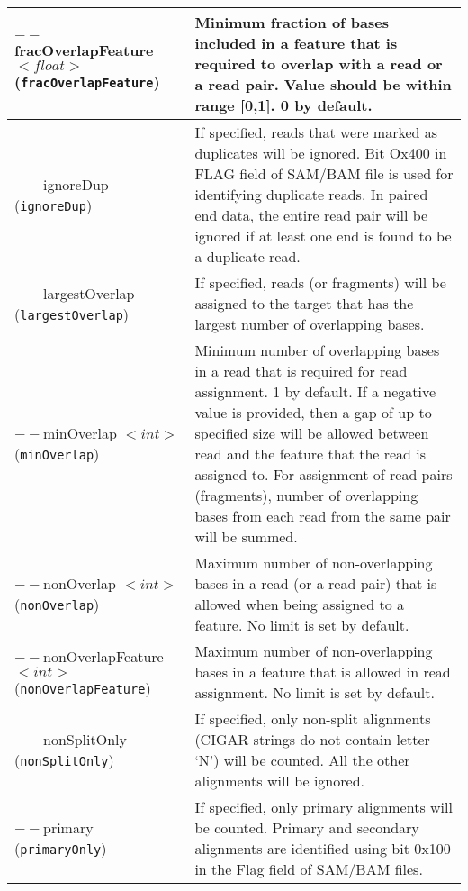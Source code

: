 \documentclass[12pt]{report}
\newcommand{\code}[1]{{\small\texttt{#1}}}
\begin{document}
\begin{longtable}{|p{5cm}|p{11cm}|}
\hline
$--$fracOverlapFeature $<float>$ \newline (\code{fracOverlapFeature}) & Minimum fraction of bases included in a feature that is required to overlap with a read or a read pair. Value should be within range [0,1]. 0 by default. \\
\hline
$--$ignoreDup \newline (\code{ignoreDup}) & If specified, reads that were marked as duplicates will be ignored. Bit Ox400 in FLAG field of SAM/BAM file is used for identifying duplicate reads. In paired end data, the entire read pair will be ignored if at least one end is found to be a duplicate read.\\
\hline
$--$largestOverlap \newline (\code{largestOverlap}) & If specified, reads (or fragments) will be assigned to the target that has the largest number of overlapping bases.\\
\hline
$--$minOverlap $<int>$ \newline (\code{minOverlap}) & Minimum number of overlapping bases in a read that is required for read assignment. 1 by default. If a negative value is provided, then a gap of up to specified size will be allowed between read and the feature that the read is assigned to. For assignment of read pairs (fragments), number of overlapping bases from each read from the same pair will be summed. \\
\hline
$--$nonOverlap $<int>$ \newline (\code{nonOverlap}) & Maximum number of non-overlapping bases in a read (or a read pair) that is allowed when being assigned to a feature. No limit is set by default. \\
\hline
$--$nonOverlapFeature $<int>$ \newline (\code{nonOverlapFeature}) & Maximum number of non-overlapping bases in a feature that is allowed in read assignment. No limit is set by default. \\
\hline
$--$nonSplitOnly \newline (\code{nonSplitOnly}) & If specified, only non-split alignments (CIGAR strings do not contain letter `N') will be counted. All the other alignments will be ignored.\\
\hline
$--$primary \newline (\code{primaryOnly}) & If specified, only primary alignments will be counted. Primary and secondary alignments are identified using bit 0x100 in the Flag field of SAM/BAM files.\\

\end{longtable}
\end{document}

